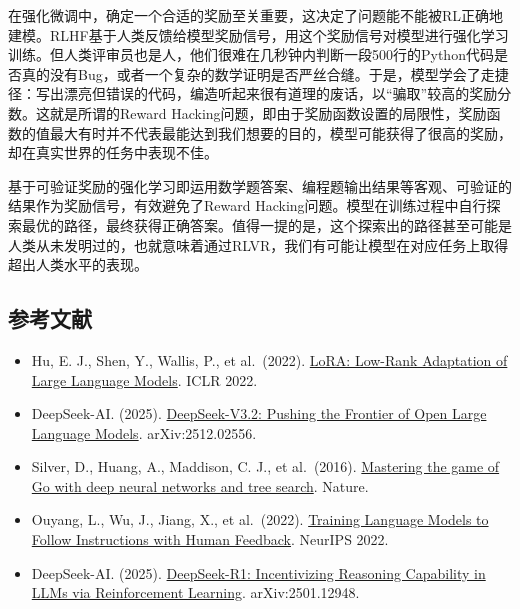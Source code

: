 在强化微调中，确定一个合适的奖励至关重要，这决定了问题能不能被RL正确地建模。RLHF基于人类反馈给模型奖励信号，用这个奖励信号对模型进行强化学习训练。但人类评审员也是人，他们很难在几秒钟内判断一段500行的Python代码是否真的没有Bug，或者一个复杂的数学证明是否严丝合缝。于是，模型学会了走捷径：写出漂亮但错误的代码，编造听起来很有道理的废话，以``骗取''较高的奖励分数。这就是所谓的Reward Hacking问题，即由于奖励函数设置的局限性，奖励函数的值最大有时并不代表最能达到我们想要的目的，模型可能获得了很高的奖励，却在真实世界的任务中表现不佳。

基于可验证奖励的强化学习即运用数学题答案、编程题输出结果等客观、可验证的结果作为奖励信号，有效避免了Reward Hacking问题。模型在训练过程中自行探索最优的路径，最终获得正确答案。值得一提的是，这个探索出的路径甚至可能是人类从未发明过的，也就意味着通过RLVR，我们有可能让模型在对应任务上取得超出人类水平的表现。

\FloatBarrier
{}
\hypertarget{ux53c2ux8003ux6587ux732e-76}{%
\subsection{参考文献}\label{ux53c2ux8003ux6587ux732e-76}}

\vspace{0.25em}
\begin{itemize}
\tightlist
\item
  Hu, E. J., Shen, Y., Wallis, P., et al.~(2022). \href{https://arxiv.org/abs/2106.09685}{LoRA: Low-Rank Adaptation of Large Language Models}. ICLR 2022.
\item
  DeepSeek-AI. (2025). \href{https://arxiv.org/abs/2512.02556}{DeepSeek-V3.2: Pushing the Frontier of Open Large Language Models}. arXiv:2512.02556.
\item
  Silver, D., Huang, A., Maddison, C. J., et al.~(2016). \href{https://www.nature.com/articles/nature16961}{Mastering the game of Go with deep neural networks and tree search}. Nature.
\item
  Ouyang, L., Wu, J., Jiang, X., et al.~(2022). \href{https://arxiv.org/abs/2203.02155}{Training Language Models to Follow Instructions with Human Feedback}. NeurIPS 2022.
\item
  DeepSeek-AI. (2025). \href{https://arxiv.org/abs/2501.12948}{DeepSeek-R1: Incentivizing Reasoning Capability in LLMs via Reinforcement Learning}. arXiv:2501.12948.
\end{itemize}

\clearpage

